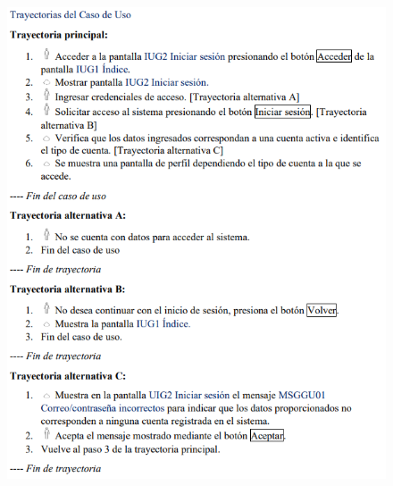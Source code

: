 \documentclass[12pt,letterpaper]{article}
\begin{document}
            \begin{figure}[H]
                \centering
                \includegraphics [scale=0.9]{specs/trayIniciarSesion}
            \end{figure}
\end{document}
